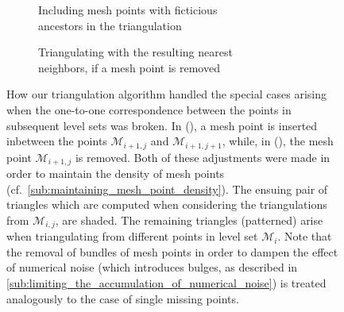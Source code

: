 \begin{figure}[htpb]
    \centering
    \begin{subfigure}[b]{0.475\textwidth}
        \centering
        \resizebox{0.9\linewidth}{!}{}
        \caption[]{{\small Including mesh points with ficticious \\\phantom{(a)} ancestors in the triangulation}}
        \label{fig:triangulation_pointinserted}
    \end{subfigure}
    \begin{subfigure}[b]{0.475\textwidth}
        \centering
        \resizebox{0.9\linewidth}{!}{}
        \caption[]{{\small Triangulating with the resulting nearest \\\phantom{(b)} neighbors, if a mesh point is removed}}
        \label{fig:triangulation_pointremoved}
    \end{subfigure}
    \caption[How our triangulation algorithm handled the special cases arising
    when the one-to-one correspondence between the points in subsequent level
    sets was broken]
    {How our triangulation algorithm handled the special cases arising when
        the one-to-one correspondence between the points in subsequent level
        sets was broken. In (),
        a mesh point is inserted inbetween the points $\mathcal{M}_{i+1,j}$
        and $\mathcal{M}_{i+1,j+1}$, while, in (),
        the mesh point $\mathcal{M}_{i+1,j}$ is removed. Both of these
        adjustments were made in order to maintain the density of mesh points
        (cf.\ \cref{sub:maintaining_mesh_point_density}). The ensuing pair of
        triangles which are computed when considering the triangulations from
        $\mathcal{M}_{i,j}$, are shaded. The remaining triangles (patterned)
        arise when triangulating from different points in level set
        $\mathcal{M}_{i}$. Note that the removal of bundles of mesh points
        in order to dampen the effect of numerical noise (which introduces
        bulges, as described in
        \cref{sub:limiting_the_accumulation_of_numerical_noise}) is treated
        analogously to the case of single missing points.
    }
    \label{fig:triangulation_specialcases}
\end{figure}
